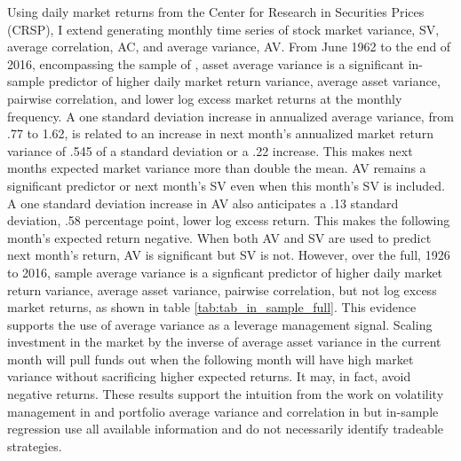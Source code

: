 Using daily market returns from the Center for Research in Securities Prices (CRSP), I extend \citet{pollet_average_2010} generating monthly time series of stock market variance, SV, average correlation, AC, and average variance, AV. From June 1962 to the end of 2016, encompassing the sample of  \citet{pollet_average_2010}, asset average variance is a significant in-sample predictor of higher daily market return variance, average asset variance, pairwise correlation, and lower log excess market returns at the monthly frequency. A one standard deviation increase in annualized average variance, from .77 to 1.62, is related to an increase in next month’s annualized market return variance of .545 of a standard deviation or a .22 increase. This makes next months expected market variance more than double the mean. AV remains a significant predictor or next month's SV even when this month's SV is included. A one standard deviation increase in AV also anticipates a .13 standard deviation, .58 percentage point, lower log excess return. This makes the following month's expected return negative. When both AV and SV are used to predict next month's return, AV is significant but SV is not. %
However, over the full, 1926 to 2016, sample average variance is a signficant predictor of higher daily market return variance, average asset variance, pairwise correlation, but not log excess market returns, as shown in table \ref{tab:tab_in_sample_full}. This evidence supports the use of average variance as a leverage management signal. Scaling investment in the market by the inverse of average asset variance in the current month will pull funds out when the following month will have high market variance without sacrificing higher expected returns. It may, in fact, avoid negative returns. These results support the intuition from the work on volatility management in \citet{moreira_volatility-managed_2017} and portfolio average variance and correlation in \citet{pollet_average_2010} but in-sample regression use all available information and do not necessarily identify tradeable strategies.\citep{Welch2008}

